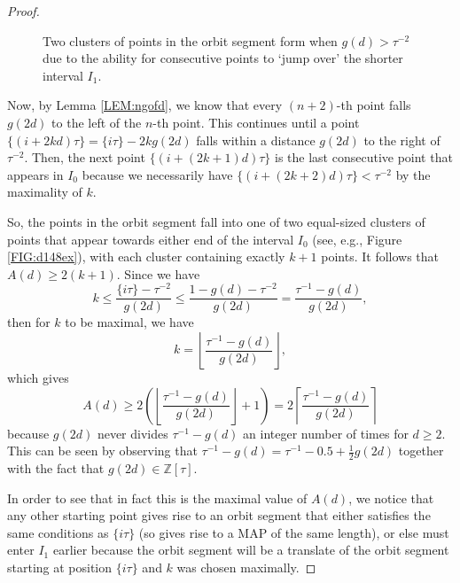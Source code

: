 \documentclass[10pt,a4paper,reqno]{amsart}
\begin{document}
\begin{proof}
\begin{figure}[ht]
\caption{Two clusters of points in the orbit segment form when $g(d)>\tau^{-2}$ due to the ability for consecutive points to `jump over' the shorter interval $I_1$.}
\label{FIG:stepdishopoverI1}
\end{figure}







Now, by Lemma \ref{LEM:ngofd}, we know that every $(n+2)$-th point falls $g(2d)$ to the left of the $n$-th point. This continues until a point $\{(i+2kd)\tau\} = \{i\tau\}-2kg(2d)$ falls within a distance $g(2d)$ to the right of $\tau^{-2}$. Then, the next point $\{ (i+(2k+1)d)\tau\}$ is the last consecutive point that appears in $I_0$ because we necessarily have $\{ (i+(2k+2)d)\tau\}<\tau^{-2}$ by the maximality of $k$. 

So, the points in the orbit segment fall into one of two equal-sized clusters of points that appear towards either end of the interval $I_0$ (see, e.g., Figure \ref{FIG:d148ex}), with each cluster containing exactly $k+1$ points. It follows that $A(d)\geq 2(k+1)$. Since we have
\[
k\leq \frac{\{ i\tau\} -\tau^{-2}}{g(2d)}\leq \frac{1-g(d) -\tau^{-2}}{g(2d)}=\frac{\tau^{-1}-g(d)}{g(2d)},
\]
then for $k$ to be maximal, we have
\[
k = \left\lfloor \frac{\tau^{-1}-g(d)}{g(2d)} \right\rfloor,
\]
which gives
\[
A(d) \geq 2\left(\left\lfloor \frac{\tau^{-1}-g(d)}{g(2d)} \right\rfloor +1\right) = 2\left\lceil \frac{\tau^{-1}-g(d)}{g(2d)} \right\rceil
\]
because $g(2d)$ never divides $\tau^{-1}-g(d)$ an integer number of times for $d \geq 2$. This can be seen by observing that $\tau^{-1}-g(d)=\tau^{-1}-0.5+\frac{1}{2}g(2d)$ together with the fact that $g(2d)\in \mathbb{Z}[\tau]$.

In order to see that in fact this is the maximal value of $A(d)$, we notice that any other starting point gives rise to an orbit segment that either satisfies the same conditions as $\{i\tau\}$ (so gives rise to a MAP of the same length), or else must enter $I_1$ earlier because the orbit segment will be a translate of the orbit segment starting at position $\{i\tau\}$ and $k$ was chosen maximally.
\end{proof}
\end{document}
